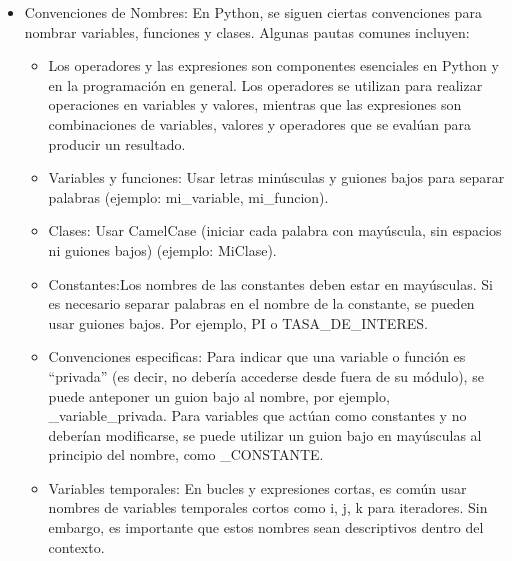 \begin{itemize}
\begin{figure}[h]
    \centering
    \end{figure}
    \item Convenciones de Nombres: En Python, se siguen ciertas convenciones para nombrar variables, funciones y clases. Algunas pautas comunes incluyen:

\begin{itemize}
    \item Los operadores y las expresiones son componentes esenciales en Python y en la programación en general. Los operadores se utilizan para realizar operaciones en variables y valores, mientras que las expresiones son combinaciones de variables, valores y operadores que se evalúan para producir un resultado. 
    \item Variables y funciones: Usar letras minúsculas y guiones bajos para separar palabras (ejemplo: mi\_variable, mi\_funcion).
    \item Clases: Usar CamelCase (iniciar cada palabra con mayúscula, sin espacios ni guiones bajos) (ejemplo: MiClase).
    \item Constantes:Los nombres de las constantes deben estar en mayúsculas. Si es necesario separar palabras en el nombre de la constante, se pueden usar guiones bajos. Por ejemplo, PI o TASA\_DE\_INTERES.
    \item Convenciones especificas: Para indicar que una variable o función es ``privada'' (es decir, no debería accederse desde fuera de su módulo), se puede anteponer un guion bajo al nombre, por ejemplo, \_variable\_privada. Para variables que actúan como constantes y no deberían modificarse, se puede utilizar un guion bajo en mayúsculas al principio del nombre, como \_CONSTANTE.
    \item Variables temporales: En bucles y expresiones cortas, es común usar nombres de variables temporales cortos como i, j, k para iteradores. Sin embargo, es importante que estos nombres sean descriptivos dentro del contexto.
\end{itemize}


\end{itemize}
